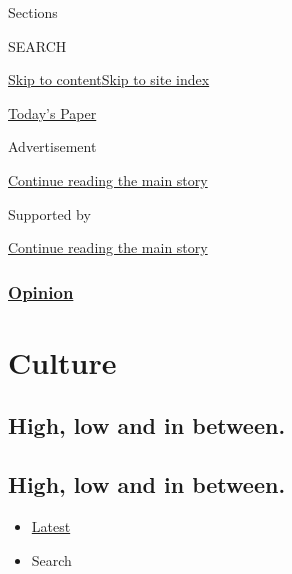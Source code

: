 Sections

SEARCH

\protect\hyperlink{site-content}{Skip to
content}\protect\hyperlink{site-index}{Skip to site index}

\href{https://myaccount.nytimes3xbfgragh.onion/auth/login?response_type=cookie\&client_id=vi}{}

\href{https://www.nytimes3xbfgragh.onion/section/todayspaper}{Today's
Paper}

Advertisement

\protect\hyperlink{after-top}{Continue reading the main story}

Supported by

\protect\hyperlink{after-sponsor}{Continue reading the main story}

\hypertarget{opinion}{%
\subsubsection{\texorpdfstring{\href{/section/opinion}{Opinion}}{Opinion}}\label{opinion}}

\hypertarget{culture}{%
\section{Culture}\label{culture}}

\hypertarget{high-low-and-in-between}{%
\subsection{High, low and in between.}\label{high-low-and-in-between}}

\hypertarget{high-low-and-in-between-1}{%
\subsection{High, low and in between.}\label{high-low-and-in-between-1}}

\begin{itemize}
\tightlist
\item
  \protect\hyperlink{stream-panel}{Latest}
\item
  Search
\end{itemize}


